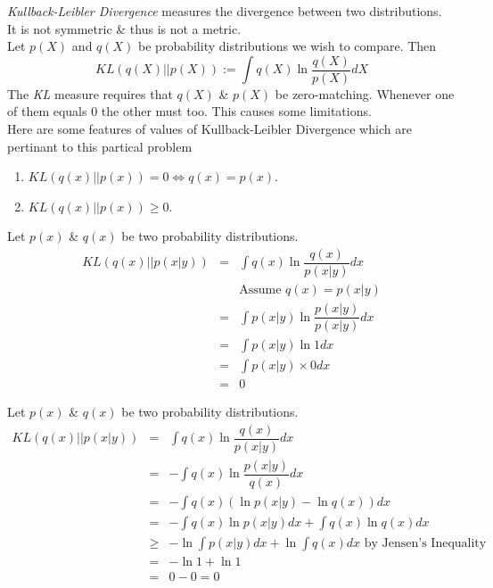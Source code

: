 \documentclass[11pt,a4paper]{article}
\begin{document}
\textit{Kullback-Leibler Divergence} measures the divergence between two distributions.\\
It is not symmetric \& thus is not a metric.\\
Let $p(X)$ and $q(X)$ be probability distributions we wish to compare. Then
$$KL(q(X)||p(X)):=\int q(X)\ln\dfrac{q(X)}{p(X)}dX$$
\nb The \textit{KL} measure requires that $q(X)$ \& $p(X)$ be zero-matching. \ie Whenever one of them equals 0 the other must too. This causes some limitations.\\

Here are some features of values of Kullback-Leibler Divergence which are pertinant to this partical problem
\begin{enumerate}
	\item $KL(q(x)||p(x))=0\Longleftrightarrow q(x)=p(x)$.
	\item $KL(q(x)||p(x))\geq0$.
\end{enumerate}

Let $p(x)$ \& $q(x)$ be two probability distributions.
\[\begin{array}{rcl}
KL(q(x)||p(x|y))&=&\displaystyle\int q(x)\ln\dfrac{q(x)}{p(x|y)}dx\\
&&\text{Assume\ }q(x)=p(x|y)\\
&=&\displaystyle\int p(x|y)\ln\dfrac{p(x|y)}{p(x|y)}dx\\
&=&\displaystyle\int p(x|y)\ln1dx\\
&=&\displaystyle\int p(x|y)\times0dx\\
&=&0
\end{array}\]

Let $p(x)$ \& $q(x)$ be two probability distributions.
\[\begin{array}{rcl}
KL(q(x)||p(x|y))&=&\displaystyle\int q(x)\ln\dfrac{q(x)}{p(x|y)}dx\\
&=&-\displaystyle\int q(x)\ln\dfrac{p(x|y)}{q(x)}dx\\
&=&-\displaystyle\int q(x)(\ln p(x|y)-\ln q(x))dx\\
&=&-\displaystyle\int q(x)\ln p(x|y)dx+\displaystyle\int q(x)\ln q(x)dx\\
&\geq&-\ln\displaystyle\int p(x|y)dx+\ln\displaystyle\int q(x)dx\text{ by Jensen's Inequality}\\
&=&-\ln 1+\ln 1\\
&=&0-0=0
\end{array}\]
\end{document}
